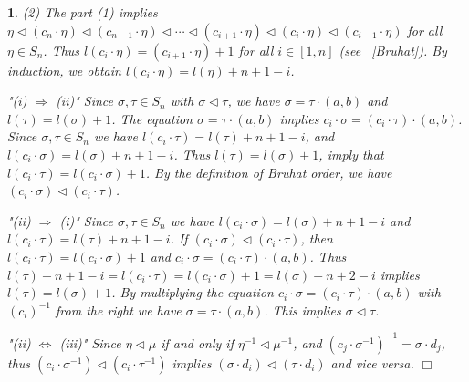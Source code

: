 \documentclass[a4 paper,12pt]{article}
\newcommand{\sma}{\triangleleft}
\newtheorem{subnum}{}[numeris]
\begin{document}
\begin{subnum}
	
	

	
	
	(2)  The part (1) implies $\eta\sma (c_{n}\cdot \eta)\sma (c_{n-1}\cdot  \eta) \sma \cdots \sma (c_{i+1}\cdot  \eta) \sma (c_{i}\cdot  \eta) \sma (c_{i-1}\cdot  \eta)$ for all $\eta\in S_n$. Thus   $l(c_{i}\cdot  \eta) = (c_{i+1}\cdot  \eta)+1$ for all $i\in \left[1,n\right]$ (see ~\ref{Bruhat}). By induction, we obtain $l(c_{i}\cdot  \eta) = l(\eta)+n+1-i$.
	
	"(i) $\Rightarrow$ (ii)" Since $\sigma, \tau \in S_n$ with $\sigma \sma \tau $, we have $\sigma = \tau \cdot  (a,b)$ and $l(\tau) = l(\sigma)+1$. The equation $\sigma = \tau \cdot  (a,b)$
	implies $c_i\cdot  \sigma = \left(c_i\cdot  \tau\right)\cdot  (a,b)$. Since $\sigma,\tau\in S_n$ we have   $l(c_{i}\cdot  \tau) = l(\tau)+n+1-i$, and  $l(c_{i}\cdot  \sigma) = l(\sigma)+n+1-i$. Thus   $l(\tau) = l(\sigma)+1$, imply that  $l(c_{i}\cdot  \tau)  = l(c_{i}\cdot  \sigma) +1 $. By the definition of Bruhat order, we have $\left(c_{i}\cdot  \sigma\right) \sma \left(c_{i}\cdot  \tau\right)$.
	
	"(ii) $\Rightarrow$ (i)" Since $\sigma,\tau\in S_n$ we have $l(c_i\cdot\sigma)=l(\sigma)+n+1-i$ and $l(c_i\cdot\tau)=l(\tau)+n+1-i$.   If $\left(c_{i}\cdot  \sigma\right) \sma \left(c_{i}\cdot  \tau\right)$, then $l\left(c_{i}\cdot  \tau\right) = l\left(c_{i}\cdot  \sigma\right) +1 $  and $c_{i}\cdot  \sigma = \left(c_{i}\cdot  \tau\right)\cdot  (a,b)$. Thus $l(\tau)+n+1-i= l\left(c_{i}\cdot  \tau\right) = l\left(c_{i}\cdot  \sigma\right) +1 = l(\sigma)+n+2-i$ implies  $l(\tau)=l(\sigma)+1$.  By multiplying the  equation $c_{i}\cdot  \sigma = \left(c_{i}\cdot  \tau\right)\cdot  (a,b)$ with $(c_i)^{-1}$ from the right we have $\sigma =\tau \cdot  (a,b)$.  	 This implies $\sigma\sma \tau$.
	
	"(ii) $\Leftrightarrow$ (iii)" Since $\eta \sma \mu $ if and only if $\eta^{-1} \sma \mu^{-1}$, and $\left(c_{j}\cdot  \sigma^{-1}\right)^{-1} = \sigma \cdot  d_{j} $, thus  $\left(c_{i}\cdot  \sigma^{-1}\right) \sma \left(c_{i}\cdot  \tau^{-1}\right)$ implies 
$ \left(\sigma \cdot  d_{i}\right)\sma \left(\tau \cdot  d_{i}\right)$ and vice versa. 
	\hfill $\Box$ 
\label{Bruhat_order_on_Blocks}
\end{subnum}
\end{document}
